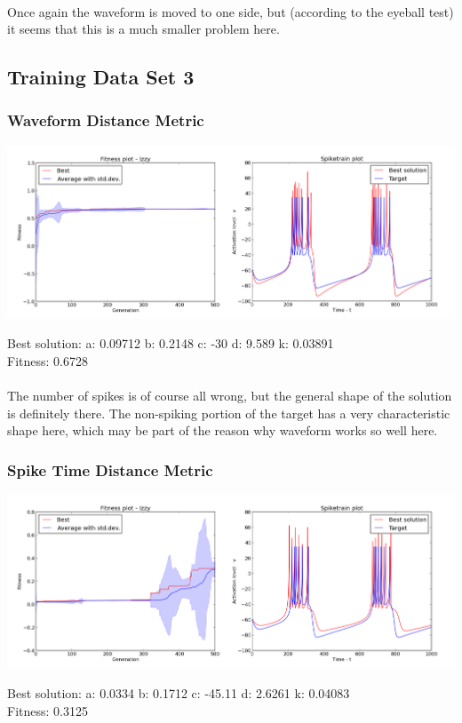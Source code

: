 \documentclass[a4paper,12pt]{article}
\begin{document}
\paragraph{}Once again the waveform is moved to one side, but (according to the eyeball test) it seems that this is a much smaller problem here.

\subsection{Training Data Set 3}
\subsubsection{Waveform Distance Metric}
\centerline{\includegraphics[width=1.3\textwidth]{img/case3_wave}}
Best solution: 
a: 0.09712 
b: 0.2148 
c: -30 
d: 9.589 
k: 0.03891 \\
Fitness: 0.6728
\paragraph{}The number of spikes is of course all wrong, but the general shape of the solution is definitely there. The non-spiking portion of the target has a very characteristic shape here, which may be part of the reason why waveform works so well here.

\subsubsection{Spike Time Distance Metric}
\centerline{\includegraphics[width=1.3\textwidth]{img/case3_time}}
Best solution: 
a: 0.0334 
b: 0.1712 
c: -45.11 
d: 2.6261 
k: 0.04083 \\
Fitness: 0.3125
\end{document}
